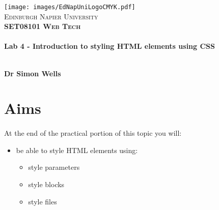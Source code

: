 \documentclass[10pt, a4paper]{article}
\begin{document}

\begin{titlepage}
\vspace*{5cm}
\begin{center}
\texttt{[image: images/EdNapUniLogoCMYK.pdf]}~\\[1cm]

\textsc{\Large Edinburgh Napier University}\\[1.5cm]

\textsc{\LARGE \bfseries SET08101 Web Tech}\\[0.5cm]

\hrulefill \\[0.4cm]
{\huge \bfseries Lab 4 - Introduction to styling HTML elements using CSS \\[0.4cm] }
\hrulefill \\[1.5cm]

\begin{minipage}{0.4\textwidth}
\begin{flushleft} \large
\textbf{Dr Simon Wells} \\
\end{flushleft}
\end{minipage}

\vfill

\end{center}
\end{titlepage}




%

\section{Aims}
\paragraph{} At the end of the practical portion of this topic you will:

\begin{itemize}
\item be able to style HTML elements using:
    \begin{itemize}
    \item style parameters
    \item style blocks
    \item style files
    \end{itemize}
\end{itemize}
\end{document}
